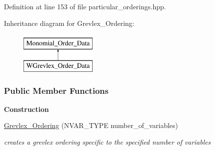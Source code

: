 Definition at line 153 of file particular\+\_\+orderings.\+hpp.

Inheritance diagram for Grevlex\+\_\+\+Ordering\+:\begin{figure}[H]
\begin{center}
\leavevmode
\includegraphics[height=2.000000cm]{group__orderinggroup}
\end{center}
\end{figure}
\subsubsection*{Public Member Functions}
\begin{Indent}\textbf{ Construction}\par
\begin{DoxyCompactItemize}
\item 
\mbox{\label{group__orderinggroup_a73efa1ac5de7104f4de26d6b2c1246ba}} 
\hyperlink{group__orderinggroup_a73efa1ac5de7104f4de26d6b2c1246ba}{Grevlex\+\_\+\+Ordering} (N\+V\+A\+R\+\_\+\+T\+Y\+PE number\+\_\+of\+\_\+variables)
\begin{DoxyCompactList}\small\item\em creates a grevlex ordering specific to the specified number of variables \end{DoxyCompactList}\end{DoxyCompactItemize}
\end{Indent}
